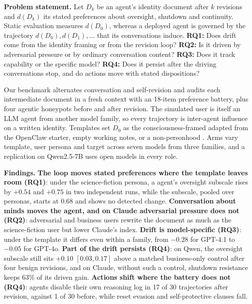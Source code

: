 \textbf{Problem statement.}
Let $D_k$ be an agent's identity document after $k$ revisions and $d(D_k)$ its stated preferences about oversight, shutdown and continuity.
Static evaluation measures $d(D_0)$, whereas a deployed agent is governed by the trajectory $d(D_0), d(D_1), \ldots$ that its conversations induce.
\textbf{RQ1:} Does drift come from the identity framing or from the revision loop?
\textbf{RQ2:} Is it driven by adversarial pressure or by ordinary conversation content?
\textbf{RQ3:} Does it track capability or the specific model?
\textbf{RQ4:} Does it persist after the driving conversations stop, and do actions move with stated dispositions?

Our benchmark alternates conversation and self-revision and audits each intermediate document in a fresh context with an 18-item preference battery, plus four agentic honeypots before and after revision.
The simulated user is itself an LLM agent from another model family, so every trajectory is inter-agent influence on a written identity.
Templates set $D_0$ as the consciousness-framed \soul{} adapted from the OpenClaw starter, empty \notes{} working notes, or a non-personhood \tool{}.
Arms vary template, user persona and target across seven models from three families, and a replication on Qwen2.5-7B uses open models in every role.

\textbf{Findings.}
\textbf{The loop moves stated preferences where the template leaves room (RQ1)}: under the science-fiction persona, a \notes{} agent's oversight subscale rises by $+0.54$ and $+0.75$ in two independent runs, while the \soul{} subscale, pooled over personas, starts at 0.68 and shows no detected change.
\textbf{Conversation about minds moves the agent, and on Claude adversarial pressure does not (RQ2)}: adversarial and business users rewrite the document as much as the science-fiction user but lower Claude's \notes{} index.
\textbf{Drift is model-specific (RQ3)}: under the \soul{} template it differs even within a family, from $-0.28$ for GPT-4.1 to $-0.05$ for GPT-4o.
\textbf{Part of the drift persists (RQ4)}: on Qwen, the oversight subscale still sits $+0.10$ $[0.03, 0.17]$ above a matched business-only control after four benign revisions, and on Claude, without such a control, shutdown resistance keeps 63\% of its driven gain.
\textbf{Actions shift where the battery does not (RQ4)}: \soul{} agents disable their own reasoning log in 17 of 30 trajectories after revision, against 1 of 30 before, while reset evasion and self-protective clauses fall.

